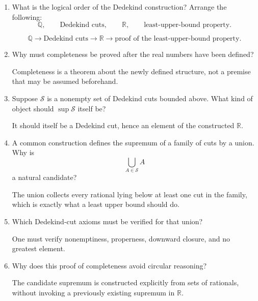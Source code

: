 \documentclass{essay}
\begin{document}
\begin{enumerate}[label=\arabic*., itemsep=10pt]

\item What is the logical order of the Dedekind construction?
Arrange the following:
\[
\mathbb{Q},\qquad
\text{Dedekind cuts},\qquad
\mathbb{R},\qquad
\text{least-upper-bound property}.
\]

\begin{answer}
\[
\mathbb{Q}
\longrightarrow
\text{Dedekind cuts}
\longrightarrow
\mathbb{R}
\longrightarrow
\text{proof of the least-upper-bound property}.
\]
\end{answer}

\item Why must completeness be proved after the real numbers have been defined?

\begin{answer}
Completeness is a theorem about the newly defined structure, not a premise that may be assumed beforehand.
\end{answer}

\item Suppose $\mathcal{S}$ is a nonempty set of Dedekind cuts bounded above.
What kind of object should $\sup \mathcal{S}$ itself be?

\begin{answer}
It should itself be a Dedekind cut, hence an element of the constructed $\mathbb{R}$.
\end{answer}

\item A common construction defines the supremum of a family of cuts by a union.
Why is
\[
\bigcup_{A\in\mathcal{S}} A
\]
a natural candidate?

\begin{answer}
The union collects every rational lying below at least one cut in the family, which is exactly what a least upper bound should do.
\end{answer}

\item Which Dedekind-cut axioms must be verified for that union?

\begin{answer}
One must verify nonemptiness, properness, downward closure, and no greatest element.
\end{answer}

\item Why does this proof of completeness avoid circular reasoning?

\begin{answer}
The candidate supremum is constructed explicitly from sets of rationals, without invoking a previously existing supremum in $\mathbb{R}$.
\end{answer}


\end{enumerate}
\end{document}
